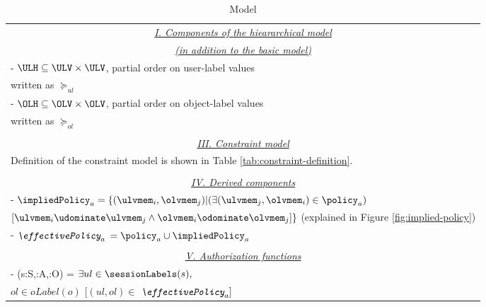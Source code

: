 \begin{table}
	\centering
	\caption{ \hlabac{} Model} %
	\label{tab:labac-definition}
		\begin{tabular}{|l|}						
		\hline								
			\multicolumn{1}{|c|}{\underline{\textit{I. Components of the hieararchical model }}} \\		
			\multicolumn{1}{|c|}{\underline{\textit{(in addition to the basic model)}}} \\		
				  - $\ULH \subseteq \ULV \times \ULV$, partial order on user-label values \\ \hfil written as $\succeq_{ul}$ \\
					
				- $\OLH \subseteq \OLV \times \OLV$, partial order on object-label values \\ \hfil written as $\succeq_{ol}$ \\ \\						  
				 
			 	\multicolumn{1}{|c|}{\underline{\textit{III. Constraint model}}} \\		
				 \hfil Definition of the constraint model is shown in Table 				 
				  \ref{tab:constraint-definition}. \\ \\
				\multicolumn{1}{|c|}{\underline{\textit{IV. Derived components}}} \\
				- $\impliedPolicy_a = \{ (\ulvmem_i, \olvmem_j) | ( \exists (\ulvmem_j, \olvmem_i) \in \policy_a)$ \\ \hfill $[ \ulvmem_i \udominate \ulvmem_j \land \olvmem_i \odominate \olvmem_j] \}$	(explained in Figure \ref{fig:implied-policy})	\\
				
				- $\textit{\effectivePolicy}_a$ $ = \policy_a \cup \impliedPolicy_a$ \\
					
				 \\
				\multicolumn{1}{|c|}{\underline{\textit{V. Authorization functions}}} \\
				- \request(s:S,\amem:A,\objmem:O) =	 
				      $\exists ul \in \sessionLabels(s) ,$ \\ \hfill $ol \in oLabel(o)$  $[ (ul,ol) \in$ $\textit{\effectivePolicy}_a ]  $  
			 
				 
			  			  
					 
 \\ \hline	
	\end{tabular}
	
\end{table}


